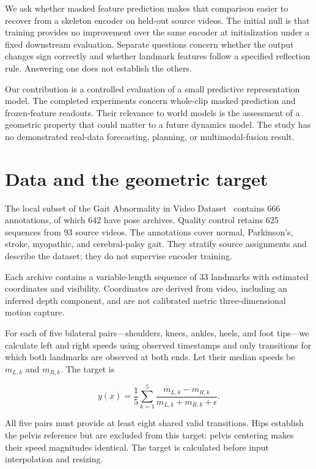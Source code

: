 \documentclass{article}
\begin{document}
We ask whether masked feature prediction makes that comparison easier to recover from a skeleton encoder on held-out source videos. The initial null is that training provides no improvement over the same encoder at initialization under a fixed downstream evaluation. Separate questions concern whether the output changes sign correctly and whether landmark features follow a specified reflection rule. Answering one does not establish the others.

Our contribution is a controlled evaluation of a small predictive representation model. The completed experiments concern whole-clip masked prediction and frozen-feature readouts. Their relevance to world models is the assessment of a geometric property that could matter to a future dynamics model. The study has no demonstrated real-data forecasting, planning, or multimodal-fusion result.

\section{Data and the geometric target}\label{data-and-the-geometric-target}

The local subset of the Gait Abnormality in Video Dataset~\citep{ref03} contains 666 annotations, of which 642 have pose archives. Quality control retains 625 sequences from 93 source videos. The annotations cover normal, Parkinson's, stroke, myopathic, and cerebral-palsy gait. They stratify source assignments and describe the dataset; they do not supervise encoder training.

Each archive contains a variable-length sequence of 33 landmarks with estimated coordinates and visibility. Coordinates are derived from video, including an inferred depth component, and are not calibrated metric three-dimensional motion capture.

For each of five bilateral pairs---shoulders, knees, ankles, heels, and foot tips---we calculate left and right speeds using observed timestamps and only transitions for which both landmarks are observed at both ends. Let their median speeds be \(m_{L,k}\) and \(m_{R,k}\). The target is

\[
y(x)=\frac{1}{5}\sum_{k=1}^{5}
\frac{m_{L,k}-m_{R,k}}{m_{L,k}+m_{R,k}+\epsilon}.
\]

All five pairs must provide at least eight shared valid transitions. Hips establish the pelvis reference but are excluded from this target: pelvis centering makes their speed magnitudes identical. The target is calculated before input interpolation and resizing.
\end{document}

